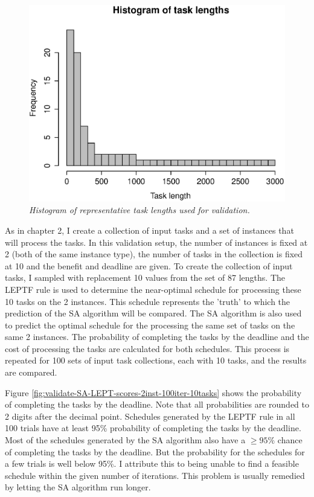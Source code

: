 \documentclass[12pt]{report}
\begin{document}
\begin{figure}
\includegraphics[width=1\textwidth]{task-lengths.eps}
\caption{\textit{Histogram of representative task lengths used for validation.}}
\label{fig:validate-SA-task-lengths}
\end{figure}


As in chapter 2, I create a collection of input tasks and a set of instances that will process the tasks. 
In this validation setup, the number of instances is fixed at 2 (both of the same instance type), the number of tasks in the collection is fixed at 10 and the benefit and deadline are given.
To create the collection of input tasks, I sampled with replacement 10 values from the set of 87 lengths.
The LEPTF rule is used to determine the near-optimal schedule for processing these 10 tasks on the 2 instances.
This schedule represents the 'truth' to which the prediction of the SA algorithm will be compared.
The SA algorithm is also used to predict the optimal schedule for the processing the same set of tasks on the same 2 instances.
The probability of completing the tasks by the deadline and the cost of processing the tasks are calculated for both schedules.
This process is repeated for 100 sets of input task collections, each with 10 tasks, and the results are compared.

Figure \ref{fig:validate-SA-LEPT-scores-2inst-100iter-10tasks} shows the probability of completing the tasks by the deadline.
Note that all probabilities are rounded to 2 digits after the decimal point.
Schedules generated by the LEPTF rule in all 100 trials have at least 95\% probability of completing the tasks by the deadline.
Most of the schedules generated by the SA algorithm also have a $\geq 95\%$ chance of completing the tasks by the deadline.
But the probability for the schedules for a few trials is well below 95\%.
I attribute this to being unable to find a feasible schedule within the given number of iterations.
This problem is usually remedied by letting the SA algorithm run longer.
\end{document}

